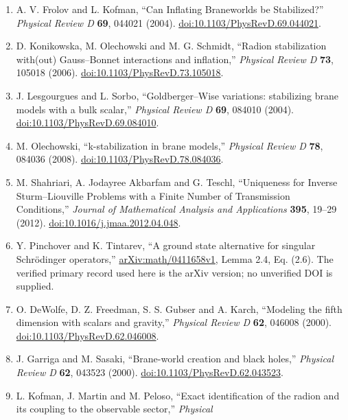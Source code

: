 \documentclass[
  11pt,
]{article}
\providecommand{\tightlist}{%
  \setlength{\itemsep}{0pt}\setlength{\parskip}{0pt}}
\begin{document}
\begin{enumerate}
\def\labelenumi{\arabic{enumi}.}
\tightlist
\item
  A. V. Frolov and L. Kofman, ``Can Inflating Braneworlds be
  Stabilized?'' \emph{Physical Review D} \textbf{69}, 044021 (2004).
  \href{https://doi.org/10.1103/PhysRevD.69.044021}{doi:10.1103/PhysRevD.69.044021}.
\item
  D. Konikowska, M. Olechowski and M. G. Schmidt, ``Radion stabilization
  with(out) Gauss--Bonnet interactions and inflation,'' \emph{Physical
  Review D} \textbf{73}, 105018 (2006).
  \href{https://doi.org/10.1103/PhysRevD.73.105018}{doi:10.1103/PhysRevD.73.105018}.
\item
  J. Lesgourgues and L. Sorbo, ``Goldberger--Wise variations:
  stabilizing brane models with a bulk scalar,'' \emph{Physical Review
  D} \textbf{69}, 084010 (2004).
  \href{https://doi.org/10.1103/PhysRevD.69.084010}{doi:10.1103/PhysRevD.69.084010}.
\item
  M. Olechowski, ``k-stabilization in brane models,'' \emph{Physical
  Review D} \textbf{78}, 084036 (2008).
  \href{https://doi.org/10.1103/PhysRevD.78.084036}{doi:10.1103/PhysRevD.78.084036}.
\item
  M. Shahriari, A. Jodayree Akbarfam and G. Teschl, ``Uniqueness for
  Inverse Sturm--Liouville Problems with a Finite Number of Transmission
  Conditions,'' \emph{Journal of Mathematical Analysis and Applications}
  \textbf{395}, 19--29 (2012).
  \href{https://doi.org/10.1016/j.jmaa.2012.04.048}{doi:10.1016/j.jmaa.2012.04.048}.
\item
  Y. Pinchover and K. Tintarev, ``A ground state alternative for
  singular Schrödinger operators,''
  \href{https://arxiv.org/abs/math/0411658v1}{arXiv:math/0411658v1},
  Lemma 2.4, Eq. (2.6). The verified primary record used here is the
  arXiv version; no unverified DOI is supplied.
\item
  O. DeWolfe, D. Z. Freedman, S. S. Gubser and A. Karch, ``Modeling the
  fifth dimension with scalars and gravity,'' \emph{Physical Review D}
  \textbf{62}, 046008 (2000).
  \href{https://doi.org/10.1103/PhysRevD.62.046008}{doi:10.1103/PhysRevD.62.046008}.
\item
  J. Garriga and M. Sasaki, ``Brane-world creation and black holes,''
  \emph{Physical Review D} \textbf{62}, 043523 (2000).
  \href{https://doi.org/10.1103/PhysRevD.62.043523}{doi:10.1103/PhysRevD.62.043523}.
\item
  L. Kofman, J. Martin and M. Peloso, ``Exact identification of the
  radion and its coupling to the observable sector,'' \emph{Physical
}
\end{enumerate}
\end{document}
